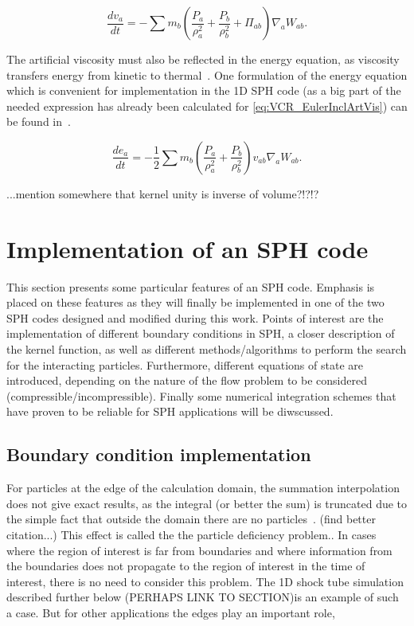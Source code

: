 \documentclass{report}
\begin{document}
\begin{equation}
\label{eq:VCR_EulerInclArtVis}
\frac{dv_{a}}{\mathit{dt}}=-\sum {m_{b}\left(\frac{P_{a}}{\rho_{a}^{2}}+\frac{P_{b}}{\rho _{b}^{2}}+\Pi _{ab}\right)\nabla_{a}W_{ab}}.
\end{equation}

The artificial viscosity must also be reflected in the energy equation, as viscosity 
transfers energy from kinetic to thermal~\cite{Monaghan2005}. One formulation of the 
energy equation which is convenient for implementation in the 1D SPH code (as a big 
part of the needed expression has already been calculated for 
\ref{eq:VCR_EulerInclArtVis}) can be found in~\cite{Liu2003}.

\begin{equation}
\label{eq:ECR_EulerInclArtVis}
\frac{de_{a}}{\mathit{dt}}=-\mathit{}\frac{1}{2}\sum{m_{b}\left(\frac{P_{a}}{\rho _{a}^{2}}+\frac{P_{b}}{\rho _{b}^{2}}\right)v_{\mathit{ab}}\nabla _{a}W_{\mathit{ab}}}.
\end{equation}

...mention somewhere that kernel unity is inverse of volume?!?!?

\section{Implementation of an SPH code}
This section presents some particular features of an SPH code. Emphasis is
placed on these features as they will finally be implemented in one of the
two SPH codes designed and modified during this work.
Points of interest are the implementation of different boundary conditions in
SPH, a closer description of the kernel function, as well as different methods/algorithms
to perform the search for the interacting particles. Furthermore, different
equations of state are introduced, depending on the nature of the flow problem
to be considered (compressible/incompressible). Finally some numerical
integration schemes that have proven to be reliable for SPH applications will be diwscussed.


\subsection{Boundary condition implementation}
\label{sec:boundaryConditionImplementation}
For particles at the edge of the calculation domain, the summation interpolation does not
give exact results, as the integral (or better the sum) is truncated due to
the simple fact that outside the domain there are no
particles~\cite{Liu2003}. (find better citation...) This effect is called the
the particle deficiency
problem.\cite{Liu2003}. In cases where the region of interest is far from boundaries
and where information from the boundaries does not propagate to the region of interest
in the time of interest, there is no need to consider this
problem. 
The 1D shock tube simulation described further below
(PERHAPS LINK TO SECTION)is an example of such a case.  
But for other applications the edges play an important role,
\end{document}
